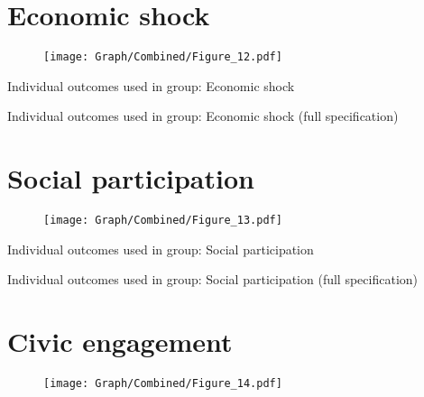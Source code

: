 \documentclass[10pt,a4paper]{article}
\begin{document}
\section{Economic shock}
\begin{table}[H]\centering

\end{table}
\begin{figure}[H]\centering
\texttt{[image: Graph/Combined/Figure\_12.pdf]}
\caption{} \label{fig:Fig_12}
\end{figure}

\begin{table}[H]\centering\caption{Individual outcomes used in group: Economic shock }
\resizebox{\textwidth}{!}{}
\end{table}
\begin{table}[H]\centering\caption{Individual outcomes used in group: Economic shock (full specification)}
\resizebox{\textwidth}{!}{}
\end{table}
\pagebreak
\section{Social participation}
\begin{table}[H]\centering

\end{table}
\begin{figure}[H]\centering
\texttt{[image: Graph/Combined/Figure\_13.pdf]}
\caption{} \label{fig:Fig_13}
\end{figure}

\begin{table}[H]\centering\caption{Individual outcomes used in group: Social participation }
\resizebox{\textwidth}{!}{}
\end{table}
\begin{table}[H]\centering\caption{Individual outcomes used in group: Social participation (full specification)}
\resizebox{\textwidth}{!}{}
\end{table}
\pagebreak
\section{Civic engagement}
\begin{table}[H]\centering

\end{table}
\begin{figure}[H]\centering
\texttt{[image: Graph/Combined/Figure\_14.pdf]}
\caption{} \label{fig:Fig_14}
\end{figure}
\end{document}
